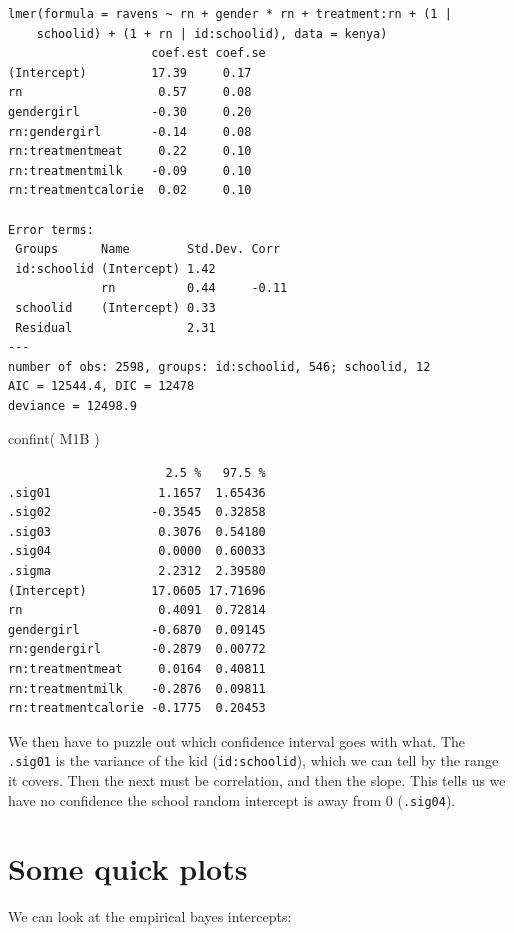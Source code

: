 \documentclass[
  letterpaper,
  DIV=11,
  numbers=noendperiod]{scrreprt}
\newenvironment{Shaded}{\begin{snugshade}}{\end{snugshade}}
\newcommand{\FunctionTok}[1]{\textcolor[rgb]{0.02,0.16,0.49}{#1}}
\newcommand{\NormalTok}[1]{\textcolor[rgb]{0.00,0.44,0.13}{#1}}
\begin{document}
\begin{verbatim}
lmer(formula = ravens ~ rn + gender * rn + treatment:rn + (1 | 
    schoolid) + (1 + rn | id:schoolid), data = kenya)
                    coef.est coef.se
(Intercept)         17.39     0.17  
rn                   0.57     0.08  
gendergirl          -0.30     0.20  
rn:gendergirl       -0.14     0.08  
rn:treatmentmeat     0.22     0.10  
rn:treatmentmilk    -0.09     0.10  
rn:treatmentcalorie  0.02     0.10  

Error terms:
 Groups      Name        Std.Dev. Corr  
 id:schoolid (Intercept) 1.42           
             rn          0.44     -0.11 
 schoolid    (Intercept) 0.33           
 Residual                2.31           
---
number of obs: 2598, groups: id:schoolid, 546; schoolid, 12
AIC = 12544.4, DIC = 12478
deviance = 12498.9 
\end{verbatim}

\begin{Shaded}
\begin{Highlighting}[]
\FunctionTok{confint}\NormalTok{( M1B )}
\end{Highlighting}
\end{Shaded}

\begin{verbatim}
                      2.5 %   97.5 %
.sig01               1.1657  1.65436
.sig02              -0.3545  0.32858
.sig03               0.3076  0.54180
.sig04               0.0000  0.60033
.sigma               2.2312  2.39580
(Intercept)         17.0605 17.71696
rn                   0.4091  0.72814
gendergirl          -0.6870  0.09145
rn:gendergirl       -0.2879  0.00772
rn:treatmentmeat     0.0164  0.40811
rn:treatmentmilk    -0.2876  0.09811
rn:treatmentcalorie -0.1775  0.20453
\end{verbatim}

We then have to puzzle out which confidence interval goes with what. The
\texttt{.sig01} is the variance of the kid (\texttt{id:schoolid}), which
we can tell by the range it covers. Then the next must be correlation,
and then the slope. This tells us we have no confidence the school
random intercept is away from 0 (\texttt{.sig04}).

\hypertarget{some-quick-plots}{%
\section{Some quick plots}\label{some-quick-plots}}

We can look at the empirical bayes intercepts:
\end{document}
